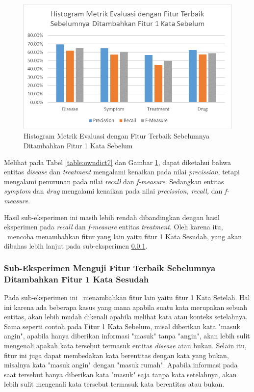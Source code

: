 	\begin{figure}
		\centering
		\includegraphics[width=0.85\linewidth]{images/histogram7}
		\caption{Histogram Metrik Evaluasi dengan Fitur Terbaik Sebelumnya Ditambahkan Fitur 1 Kata Sebelum}
		\label{fig:owndict7}
	\end{figure}
	
	Melihat pada Tabel \ref{table:owndict7} dan Gambar \ref{fig:owndict7}, dapat diketahui bahwa entitas \textit{disease} dan \textit{treatment} mengalami kenaikan pada nilai \textit{precission}, tetapi mengalami penurunan pada nilai \textit{recall} dan \textit{f-measure}. Sedangkan entitas \textit{symptom} dan \textit{drug} mengalami kenaikan pada nilai \textit{precission, recall,} dan \textit{f-measure}.
	
	Hasil sub-eksperimen ini masih lebih rendah dibandingkan dengan hasil eksperimen \cite{skripsiKakRadit} pada \textit{recall} dan \textit{f-measure} entitas \textit{treatment}. Oleh karena itu, \saya~mencoba menambahkan fitur yang lain yaitu fitur 1 Kata Sesudah, yang akan dibahas lebih lanjut pada sub-eksperimen \ref{eks:subekswaf1}.
	
	
	\subsubsection{Sub-Eksperimen Menguji Fitur Terbaik Sebelumnya Ditambahkan Fitur 1 Kata Sesudah}\label{eks:subekswaf1}
	Pada sub-eksperimen ini \saya~menambahkan fitur lain yaitu fitur 1 Kata Setelah. Hal ini karena ada beberapa kasus yang mana apabila suatu kata merupakan sebuah entitas, akan lebih mudah dikenali apabila melihat kata atau konteks setelahnya. Sama seperti contoh pada Fitur 1 Kata Sebelum, misal diberikan kata "masuk angin", apabila hanya diberikan informasi "masuk" tanpa "angin", akan lebih sulit mengenali apakah kata tersebut termasuk entitas \textit{disease} atau bukan. Selain itu, fitur ini juga dapat membedakan kata berentitas dengan kata yang bukan, misalnya kata "masuk angin" dengan "masuk rumah". Apabila informasi pada saat tersebut hanya diberikan kata "masuk" saja tanpa kata setelahnya, akan lebih sulit mengenali kata tersebut termasuk kata berentitas atau bukan.
	
